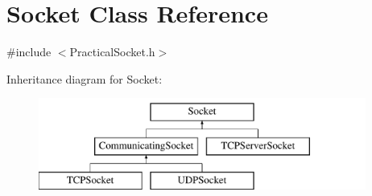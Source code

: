 \hypertarget{classSocket}{\section{Socket Class Reference}
\label{classSocket}
}


{\ttfamily \#include $<$Practical\-Socket.\-h$>$}

Inheritance diagram for Socket\-:\begin{figure}[H]
\begin{center}
\leavevmode
\includegraphics[height=3.000000cm]{classSocket}
\end{center}
\end{figure}
